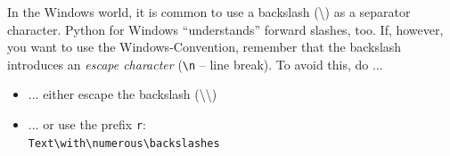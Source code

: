 \begin{frame}[fragile]
%
\begin{hintbox}
In the Windows world, it is common to use a backslash (\textbackslash) as a separator character. Python for Windows \enquote{understands} forward slashes, too. If, however, you want to use the Windows-Convention, remember that the backslash introduces an \emph{escape character} (\eg \texttt{\textbackslash n} -- line break). To avoid this, do ...

\vspace{12pt}
\begin{itemize}
\item ... either escape the backslash (\textbackslash\textbackslash)
\item ... or use the prefix \texttt{r}: \\
	\thus \texttt{Text\textbackslash with\textbackslash numerous\textbackslash backslashes}
\end{itemize}
\end{hintbox}
%
\end{frame}


